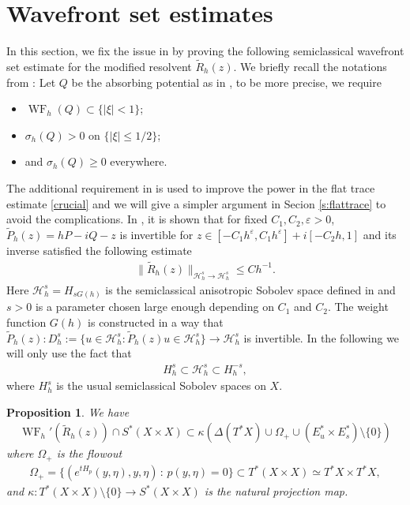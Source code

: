 \documentclass[reqno,12pt,letterpaper]{amsart}
\newtheorem{prop}{Proposition}
\numberwithin{equation}{section}
\numberwithin{prop}{section}
\DeclareMathOperator{\WF}{WF}
\newcommand{\Hcal}{{\mathcal H}}
\begin{document}
\section{Wavefront set estimates}
\label{s:wavefront}

In this section, we fix the issue in \cite{local} by proving the following semiclassical wavefront set estimate for the modified resolvent $\widetilde{R}_h(z)$. We briefly recall the notations from \cite{local}: Let $Q$ be the absorbing potential as in \cite{local}, to be more precise, we require
\begin{itemize}
\item $\WF_h(Q)\subset\{|\xi|<1\}$;
\item $\sigma_h(Q)>0$ on $\{|\xi|\leq 1/2\}$;
\item and $\sigma_h(Q)\geq0$ everywhere.
\end{itemize}
The additional requirement in \cite[\S 2.5]{local} is used to improve the power in the flat trace estimate \eqref{crucial} and we will give a simpler argument in Secion \ref{s:flattrace} to avoid the complications. In \cite[Proposition 3.4]{zeta}, it is shown that for fixed $C_1,C_2,\varepsilon>0$, $\widetilde{P}_h(z)=hP-iQ-z$ is invertible for $z\in [-C_1h^\varepsilon,C_1h^\varepsilon]+i[-C_2h,1]$ and its inverse satisfied the following estimate
\begin{align*}
    \|\widetilde{R}_h(z)\|_{\Hcal^s_h\to \Hcal^s_h}\leq Ch^{-1}.
\end{align*}
Here $\Hcal^s_h=H_{sG(h)}$ is the semiclassical anisotropic Sobolev space defined in \cite[\S 3.3]{zeta} and $s>0$ is a parameter chosen large enough depending on $C_1$ and $C_2$. The weight function $G(h)$ is constructed in a way that $\widetilde{P}_h(z):D^s_h:=\{u\in \Hcal^s_h: \widetilde{P}_h(z)u\in\Hcal^s_h\}\to \Hcal^s_h$ is invertible. In the following we will only use the fact that 
\begin{align*}
    H^s_h\subset \Hcal^s_h\subset H^{-s}_h,
\end{align*}
where $H^s_h$ is the usual semiclassical Sobolev spaces on $X$.

\begin{prop}
\label{wf}
We have 
\begin{align}
\label{e:semiwf}
    \WF_h'(\widetilde{R}_h(z))\cap S^*(X\times X)\subset \kappa(\Delta(T^*X)\cup \Omega_+\cup(E_u^*\times E_s^*)\setminus\{0\})
\end{align}
where $\Omega_+$ is the flowout
\begin{align*}
    \Omega_+=\{(e^{tH_p}(y,\eta),y,\eta)\,:\, p(y,\eta)=0\}\subset T^\ast(X\times X)\simeq T^\ast X\times T^\ast X,
\end{align*}
and $\kappa:T^\ast(X\times X)\setminus\{0\}\to S^\ast(X\times X)$ is the natural projection map.
\end{prop}
\end{document}
